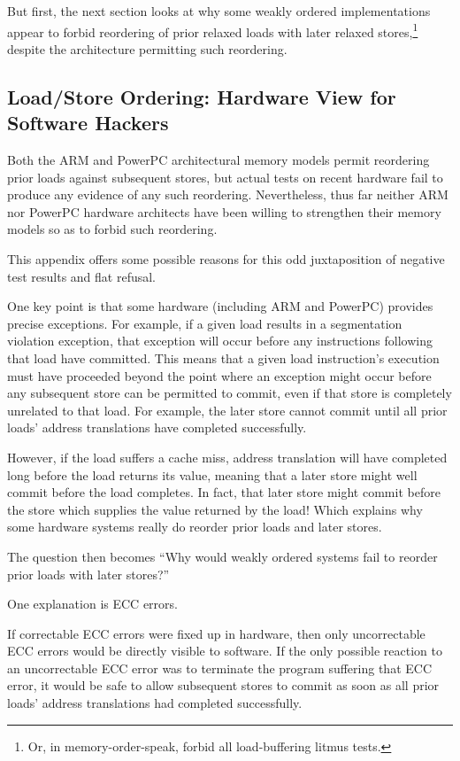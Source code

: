 \documentclass[10]{article}
\begin{document}
But first, the next section looks at why some weakly ordered
implementations appear to forbid reordering of prior relaxed loads with
later relaxed stores,\footnote{
	Or, in memory-order-speak, forbid all load-buffering litmus tests.}
despite the architecture permitting such reordering.

\subsection{Load/Store Ordering: Hardware View for Software Hackers}
\label{sec:Load/Store Ordering: Hardware View for Software Hackers}


Both the ARM and PowerPC architectural memory models permit reordering prior loads
against subsequent stores, but actual tests on recent hardware fail to
produce any evidence of any such reordering.
Nevertheless, thus far neither ARM nor PowerPC hardware architects
have been willing to strengthen their memory models so as to forbid
such reordering.

This appendix offers some possible reasons for this odd juxtaposition
of negative test results and flat refusal.

One key point is that some hardware (including ARM and PowerPC) provides
precise exceptions.
For example, if a given load results in a segmentation violation
exception, that exception will occur before any instructions following
that load have committed.
This means that a given load instruction's execution must have proceeded
beyond the point where an exception might occur before any subsequent
store can be permitted to commit, even if that store is completely
unrelated to that load.
For example, the later store cannot commit until all prior loads' address
translations have completed successfully.

However, if the load suffers a cache miss, address translation will have
completed long before the load returns its value, meaning that a later
store might well commit before the load completes.
In fact, that later store might commit before the store which supplies the
value returned by the load!
Which explains why some hardware systems really do reorder prior loads
and later stores.

The question then becomes ``Why would weakly ordered systems fail to
reorder prior loads with later stores?''

One explanation is ECC errors.

If correctable ECC errors were fixed up in hardware, then only uncorrectable
ECC errors would be directly visible to software.
If the only possible reaction to an uncorrectable ECC error was to
terminate the program suffering that ECC error, it would be safe to
allow subsequent stores to commit as soon as all prior loads' address
translations had completed successfully.
\end{document}
